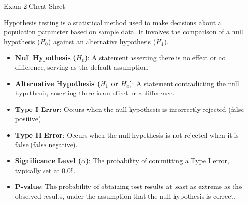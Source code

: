 \begin{cheatsheet}{Exam 2 Cheat Sheet}
{        Hypothesis testing is a statistical method used to make decisions about a population parameter based on sample data. It involves the comparison of a null hypothesis ($H_0$) against an alternative 
        hypothesis ($H_1$).
    
        \begin{itemize}
            \item \textbf{Null Hypothesis ($H_0$)}: A statement asserting there is no effect or no difference, serving as the default assumption.
            \item \textbf{Alternative Hypothesis ($H_1$ or $H_a$)}: A statement contradicting the null hypothesis, asserting there is an effect or a difference.
            \item \textbf{Type I Error}: Occurs when the null hypothesis is incorrectly rejected (false positive).
            \item \textbf{Type II Error}: Occurs when the null hypothesis is not rejected when it is false (false negative).
            \item \textbf{Significance Level ($\alpha$)}: The probability of committing a Type I error, typically set at 0.05.
            \item \textbf{P-value}: The probability of obtaining test results at least as extreme as the observed results, under the assumption that the null hypothesis is correct.
        \end{itemize}
    } \normalsize
\end{cheatsheet}

